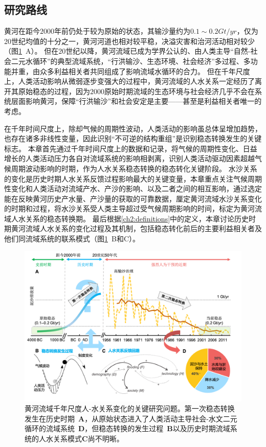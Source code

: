 \subsection{研究路线}\label{sec:ch3:method}

黄河在距今$2000$年前仍处于较为原始的状态，其输沙量约为$0.1 \sim 0.2 Gt/yr$，仅为20世纪均值的十分之一\cite{xu2003a}，黄河河道也相对较平稳，决溢灾害和治河活动相对较少（图\ref{fig:ch3:why_regime_shift}~A）\cite{WangWeiJing2009, chen2012}。
但在$20$世纪以降，黄河流域已成为学界公认的、由人类主导“自然-社会二元水循环”的典型流域系统，“行洪输沙、生态环境、社会经济”多过程、多功能并重，由众多利益相关者共同组成了影响流域水循环的合力\cite{jiang2020b}。
但在千年尺度上，人类活动影响从微弱逐步变强大的过程中，黄河流域的人水关系一定经历了离开其原始稳态的过程，因为$2000$原始时期流域的生态环境与社会经济几乎不会在系统层面影响黄河，保障“行洪输沙”和社会安定是主要——甚至是利益相关者唯一的考虑。

在千年时间尺度上，除却气候的周期性波动，人类活动的影响虽总体呈增加趋势，也存在诸多非线性变量，因此识别“不可逆的结构重组”是识别稳态转换发生的关键标志\cite{GeQuanSheng2011}。
本章首先通过千年时间尺度上的数据和记录，将气候的周期性变化、日益增长的人类活动压力各自对流域系统的影响相剥离，识别人类活动驱动因素超越气候周期波动影响的时期，作为人水关系稳态转换的稳态转化关键阶段。
水沙关系的变化是历史时期人水关系反馈过程影响最大的关键变量，本章重点关注气候周期性变化和人类活动对流域产水、产沙的影响、以及二者之间的相互影响，通过选定能在反映黄河历史产水量、产沙量的获取的可靠数据，厘定黄河流域水沙关系变化的时期和过程，将水沙关系受人类主导超过受气候周期影响的时间，标定为黄河流域人水关系的稳态转换期。
最后根据\ref{ch2:definitions}中的定义，本章讨论历史时期黄河流域人水关系的变化过程及其机制，包括稳态转化前后的主要利益相关者及他们同流域系统的联系模式（图\ref{fig:ch3:why_regime_shift}~B和C）。

\begin{figure}[!htb] %
    \centering
    \includegraphics[width=\textwidth]{img/ch3/ch3_why_regime_shift.png}
    \caption[黄河流域千年尺度人-水关系变化的关键研究问题]{黄河流域千年尺度人-水关系变化的关键研究问题。第一次稳态转换发生在历史时期~\textbf{A}，从原始状态进入了人类活动主导社会-水文二元循环的流域系统~\textbf{D}，但稳态转换的发生过程~\textbf{B}以及历史时期流域系统的人水关系模式\textbf{C}尚不明晰。}\label{fig:ch3:why_regime_shift}
\end{figure}

